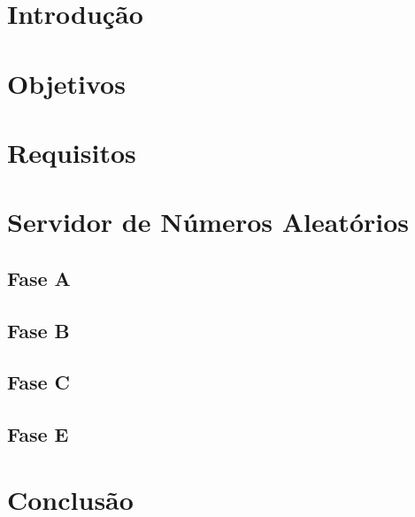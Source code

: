 \documentclass[12pt,a4paper,table]{report}
\begin{document}
 



{
\tableofcontents
{}
}

{
\let\origaddvspace\addvspace
 \renewcommand{\addvspace}[1]{}
 \listoffigures
 \listoftables
 \lstlistoflistings
 \renewcommand{\addvspace}[1]{\origaddvspace{#1}}
 }
 
\chapter{Introdução}


\chapter{Objetivos}


\chapter{Requisitos}


\chapter{Servidor de Números Aleatórios}


\section{Fase A}


\section{Fase B}


\section{Fase C}


\section{Fase E}


\chapter{Conclusão}


\restoregeometry
\end{document}
